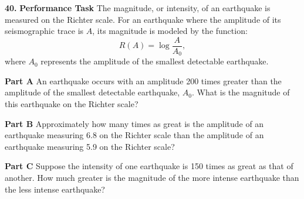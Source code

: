 \documentclass{article}
\newenvironment{practice}[2]{\textbf{#1.}}{}
\newcommand{\answer}[1]{}
\begin{document}
\begin{practice}{40}{}
\textbf{Performance Task} The magnitude, or intensity, of an earthquake is measured on the Richter scale. For an earthquake where the amplitude of its seismographic trace is $A$, its magnitude is modeled by the function:
\[ R(A) = \log\frac{A}{A_0}, \]
where $A_0$ represents the amplitude of the smallest detectable earthquake.

\textbf{Part A} An earthquake occurs with an amplitude 200 times greater than the amplitude of the smallest detectable earthquake, $A_0$. What is the magnitude of this earthquake on the Richter scale?
\answer{$\approx 2.3$}

\textbf{Part B} Approximately how many times as great is the amplitude of an earthquake measuring 6.8 on the Richter scale than the amplitude of an earthquake measuring 5.9 on the Richter scale?
\answer{$\approx 7.94$ times}

\textbf{Part C} Suppose the intensity of one earthquake is 150 times as great as that of another. How much greater is the magnitude of the more intense earthquake than the less intense earthquake?
\answer{$\approx 2.18$ greater on the Richter scale}
\end{practice}
\end{document}
